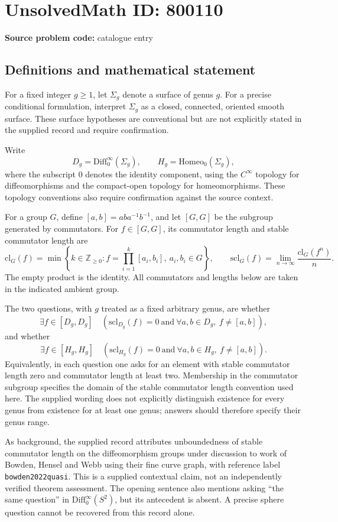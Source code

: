 \documentclass[11pt]{article}
\begin{document}
\section*{UnsolvedMath ID: 800110}
\textbf{Source problem code:} catalogue entry
\subsection{Definitions and mathematical statement}
For a fixed integer \(g\geq 1\), let \(\Sigma_g\) denote a surface of genus \(g\). For a precise conditional formulation, interpret \(\Sigma_g\) as a closed, connected, oriented smooth surface. These surface hypotheses are conventional but are not explicitly stated in the supplied record and require confirmation.

Write
\[
D_g=\mathrm{Diff}_0^\infty(\Sigma_g),\qquad H_g=\mathrm{Homeo}_0(\Sigma_g),
\]
where the subscript \(0\) denotes the identity component, using the \(C^\infty\) topology for diffeomorphisms and the compact-open topology for homeomorphisms. These topology conventions also require confirmation against the source context.

For a group \(G\), define \([a,b]=aba^{-1}b^{-1}\), and let \([G,G]\) be the subgroup generated by commutators. For \(f\in[G,G]\), its commutator length and stable commutator length are
\[
\mathrm{cl}_G(f)=\min\left\{k\in\mathbb Z_{\geq 0}: f=\prod_{i=1}^{k}[a_i,b_i],\ a_i,b_i\in G\right\},
\qquad
\mathrm{scl}_G(f)=\lim_{n\to\infty}\frac{\mathrm{cl}_G(f^n)}{n}.
\]
The empty product is the identity. All commutators and lengths below are taken in the indicated ambient group.

The two questions, with \(g\) treated as a fixed arbitrary genus, are whether
\[
\exists f\in[D_g,D_g]\quad
\left(\mathrm{scl}_{D_g}(f)=0\ \text{and}\ \forall a,b\in D_g,\ f\neq[a,b]\right),
\]
and whether
\[
\exists f\in[H_g,H_g]\quad
\left(\mathrm{scl}_{H_g}(f)=0\ \text{and}\ \forall a,b\in H_g,\ f\neq[a,b]\right).
\]
Equivalently, in each question one asks for an element with stable commutator length zero and commutator length at least two. Membership in the commutator subgroup specifies the domain of the stable commutator length convention used here. The supplied wording does not explicitly distinguish existence for every genus from existence for at least one genus; answers should therefore specify their genus range.

As background, the supplied record attributes unboundedness of stable commutator length on the diffeomorphism groups under discussion to work of Bowden, Hensel and Webb using their fine curve graph, with reference label \texttt{bowden2022quasi}. This is a supplied contextual claim, not an independently verified theorem assessment. The opening sentence also mentions asking ``the same question'' in \(\mathrm{Diff}_0^\infty(S^2)\), but its antecedent is absent. A precise sphere question cannot be recovered from this record alone.
\end{document}
